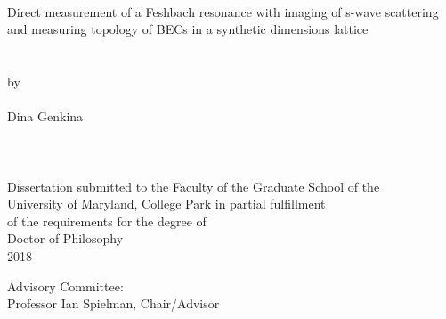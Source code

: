 
\thispagestyle{empty}
\hbox{\ }
\vspace{1in}
\renewcommand{\baselinestretch}{1}
\small\normalsize
\begin{center}

\large{{Direct measurement of a Feshbach resonance with imaging of s-wave scattering\\
 and measuring topology of BECs in a synthetic dimensions lattice}}\\
\ \\
\ \\
\large{by} \\
\ \\
\large{Dina Genkina}%
\ \\
\ \\
\ \\
\ \\
\normalsize
Dissertation submitted to the Faculty of the Graduate School of the \\
University of Maryland, College Park in partial fulfillment \\
of the requirements for the degree of \\
Doctor of Philosophy \\
2018
\end{center}

\vspace{7.5em}

\noindent Advisory Committee: \\
Professor Ian Spielman, Chair/Advisor \\

